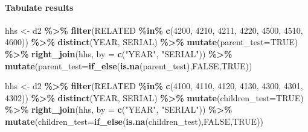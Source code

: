 \documentclass[
]{book}
\newenvironment{Shaded}{\begin{snugshade}}{\end{snugshade}}
\newcommand{\AttributeTok}[1]{\textcolor[rgb]{0.13,0.29,0.53}{#1}}
\newcommand{\ConstantTok}[1]{\textcolor[rgb]{0.56,0.35,0.01}{#1}}
\newcommand{\DecValTok}[1]{\textcolor[rgb]{0.00,0.00,0.81}{#1}}
\newcommand{\FunctionTok}[1]{\textcolor[rgb]{0.13,0.29,0.53}{\textbf{#1}}}
\newcommand{\NormalTok}[1]{#1}
\newcommand{\OtherTok}[1]{\textcolor[rgb]{0.56,0.35,0.01}{#1}}
\newcommand{\SpecialCharTok}[1]{\textcolor[rgb]{0.81,0.36,0.00}{\textbf{#1}}}
\newcommand{\StringTok}[1]{\textcolor[rgb]{0.31,0.60,0.02}{#1}}
\begin{document}
\hypertarget{tabulate-results}{%
\paragraph*{Tabulate results}\label{tabulate-results}}

\begin{Shaded}
\begin{Highlighting}[]
\NormalTok{  hhs }\OtherTok{\textless{}{-}}\NormalTok{ d2 }\SpecialCharTok{\%\textgreater{}\%} \FunctionTok{filter}\NormalTok{(RELATED }\SpecialCharTok{\%in\%} \FunctionTok{c}\NormalTok{(}\DecValTok{4200}\NormalTok{, }\DecValTok{4210}\NormalTok{, }\DecValTok{4211}\NormalTok{, }\DecValTok{4220}\NormalTok{, }\DecValTok{4500}\NormalTok{, }\DecValTok{4510}\NormalTok{, }\DecValTok{4600}\NormalTok{)) }\SpecialCharTok{\%\textgreater{}\%} \FunctionTok{distinct}\NormalTok{(YEAR, SERIAL) }\SpecialCharTok{\%\textgreater{}\%} \FunctionTok{mutate}\NormalTok{(}\AttributeTok{parent\_test=}\ConstantTok{TRUE}\NormalTok{) }\SpecialCharTok{\%\textgreater{}\%} \FunctionTok{right\_join}\NormalTok{(hhs, }\AttributeTok{by =} \FunctionTok{c}\NormalTok{(}\StringTok{"YEAR"}\NormalTok{, }\StringTok{"SERIAL"}\NormalTok{)) }\SpecialCharTok{\%\textgreater{}\%} \FunctionTok{mutate}\NormalTok{(}\AttributeTok{parent\_test=}\FunctionTok{if\_else}\NormalTok{(}\FunctionTok{is.na}\NormalTok{(parent\_test),}\ConstantTok{FALSE}\NormalTok{,}\ConstantTok{TRUE}\NormalTok{))}


\NormalTok{  hhs }\OtherTok{\textless{}{-}}\NormalTok{ d2 }\SpecialCharTok{\%\textgreater{}\%} \FunctionTok{filter}\NormalTok{(RELATED }\SpecialCharTok{\%in\%} \FunctionTok{c}\NormalTok{(}\DecValTok{4100}\NormalTok{, }\DecValTok{4110}\NormalTok{, }\DecValTok{4120}\NormalTok{, }\DecValTok{4130}\NormalTok{, }\DecValTok{4300}\NormalTok{, }\DecValTok{4301}\NormalTok{, }\DecValTok{4302}\NormalTok{)) }\SpecialCharTok{\%\textgreater{}\%} \FunctionTok{distinct}\NormalTok{(YEAR, SERIAL) }\SpecialCharTok{\%\textgreater{}\%} \FunctionTok{mutate}\NormalTok{(}\AttributeTok{children\_test=}\ConstantTok{TRUE}\NormalTok{) }\SpecialCharTok{\%\textgreater{}\%} \FunctionTok{right\_join}\NormalTok{(hhs, }\AttributeTok{by =} \FunctionTok{c}\NormalTok{(}\StringTok{"YEAR"}\NormalTok{, }\StringTok{"SERIAL"}\NormalTok{)) }\SpecialCharTok{\%\textgreater{}\%} \FunctionTok{mutate}\NormalTok{(}\AttributeTok{children\_test=}\FunctionTok{if\_else}\NormalTok{(}\FunctionTok{is.na}\NormalTok{(children\_test),}\ConstantTok{FALSE}\NormalTok{,}\ConstantTok{TRUE}\NormalTok{))}
  

\end{Highlighting}
\end{Shaded}
\end{document}
